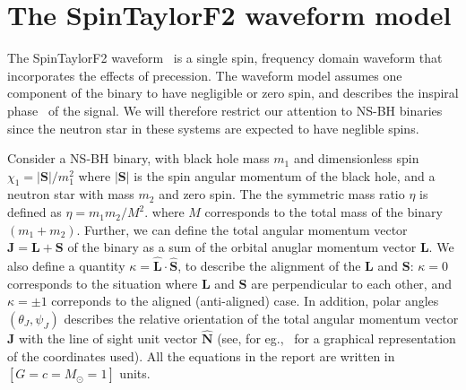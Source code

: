 \chapter{The SpinTaylorF2 waveform model} 

\label{chap:SpinTaylorF2} 
The SpinTaylorF2 waveform~\cite{Lundgren2014} is a single spin, frequency domain
waveform that incorporates the effects of precession.  The waveform model
assumes one component of the binary to have negligible or zero spin, and
describes the inspiral phase~\cite{Event_0} of the signal. We will therefore
restrict our attention to NS-BH binaries since the neutron star in these systems
are expected to have neglible spins. 

Consider a NS-BH binary, with black hole
mass $m_{1}$ and dimensionless spin $\chi_{1} = |\mathbf{S}|/m_{1}^2$ where
$|\mathbf{S}|$ is the spin angular momentum of the black hole, and a neutron
star with mass $m_{2}$ and zero spin. The the symmetric mass ratio $\eta$ is
defined as $\eta=m_{1}m_{2}/M^2$. where $M$ corresponds to the total mass of the
binary $(m_{1} + m_{2})$.  Further, we can define the total angular momentum
vector $\mathbf{J}=\mathbf{L} + \mathbf{S}$ of the binary as a sum of the
orbital anuglar momentum vector $\mathbf{L}$. We also define a quantity
$\kappa=\hat{\mathbf{L}}\cdot\hat{\mathbf{S}}$, to describe the alignment of the
$\mathbf{L}$ and $\mathbf{S}$: $\kappa=0$ corresponds to the situation where
$\mathbf{L}$ and $\mathbf{S}$ are perpendicular to each other, and $\kappa=\pm
1$ correponds to the aligned (anti-aligned) case. In addition, polar angles
$(\theta_{J}, \psi_{J})$  describes the relative orientation  of the total
angular momentum vector $\mathbf{J}$ with the line of sight unit vector
$\hat{\mathbf{N}}$ (see, for eg.,~\cite{thetaJ} for a graphical representation
of the coordinates used). All the equations in the report are written in 
$\left[G = c = M_{\odot }= 1\right]$ units.

